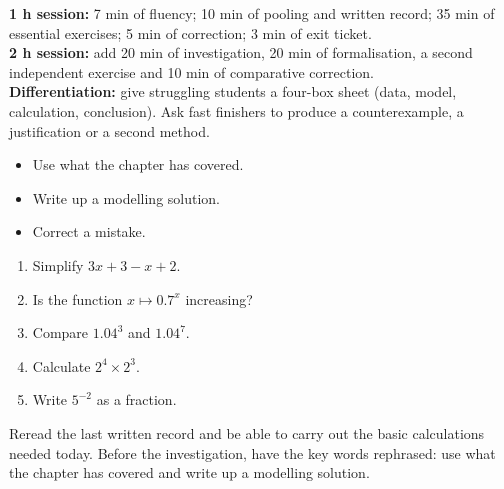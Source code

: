 \ifmxteacher
\begin{method}
\textbf{1 h session:} 7 min of fluency; 10 min of pooling and written record; 35 min of essential exercises; 5 min of correction; 3 min of exit ticket.\\
\textbf{2 h session:} add 20 min of investigation, 20 min of formalisation, a second independent exercise and 10 min of comparative correction.\\
\textbf{Differentiation:} give struggling students a four-box sheet (data, model, calculation, conclusion). Ask fast finishers to produce a counterexample, a justification or a second method.
\end{method}
\fi
{}
\begin{objectives}\begin{itemize}\item Use what the chapter has covered.\item Write up a modelling solution.\item Correct a mistake.\end{itemize}\end{objectives}
\begin{fluency}\begin{enumerate}\item Simplify $3x+3-x+2$. \item Is the function $x\mapsto\num{0,7}^x$ increasing? \item Compare $\num{1,04}^3$ and $\num{1,04}^7$. \item Calculate $2^4\times2^3$. \item Write $5^{-2}$ as a fraction. \end{enumerate}\end{fluency}
\begin{prerequisites}Reread the last written record and be able to carry out the basic calculations needed today. Before the investigation, have the key words rephrased: use what the chapter has covered and write up a modelling solution.\end{prerequisites}

